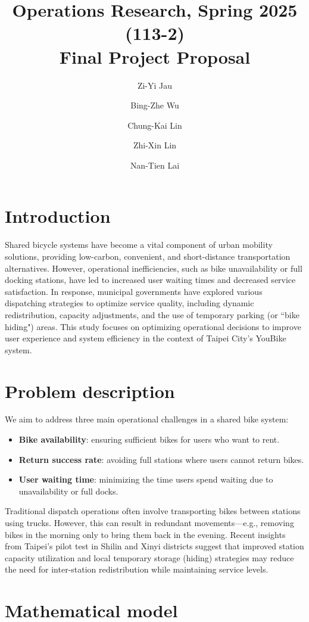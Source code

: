 \documentclass[11pt,a4paper]{article}
\title{Operations Research, Spring 2025 (113-2) \\ Final Project Proposal}
\author{Zi-Yi Jau} %
\author{Bing-Zhe Wu} %
\author{Chung-Kai Lin} %
\author{Zhi-Xin Lin} %
\author{Nan-Tien Lai} %
\affil{Department of Information Management, National Taiwan University}
\begin{document}
\maketitle

\section{Introduction}

Shared bicycle systems have become a vital component of urban mobility solutions, providing low-carbon, convenient, and short-distance transportation alternatives. However, operational inefficiencies, such as bike unavailability or full docking stations, have led to increased user waiting times and decreased service satisfaction. In response, municipal governments have explored various dispatching strategies to optimize service quality, including dynamic redistribution, capacity adjustments, and the use of temporary parking (or ``bike hiding") areas. This study focuses on optimizing operational decisions to improve user experience and system efficiency in the context of Taipei City's YouBike system.

\section{Problem description}

We aim to address three main operational challenges in a shared bike system:
\begin{itemize}
    \item \textbf{Bike availability}: ensuring sufficient bikes for users who want to rent.
    \item \textbf{Return success rate}: avoiding full stations where users cannot return bikes.
    \item \textbf{User waiting time}: minimizing the time users spend waiting due to unavailability or full docks.
\end{itemize}

Traditional dispatch operations often involve transporting bikes between stations using trucks. However, this can result in redundant movements—e.g., removing bikes in the morning only to bring them back in the evening. Recent insights from Taipei’s pilot test in Shilin and Xinyi districts suggest that improved station capacity utilization and local temporary storage (hiding) strategies may reduce the need for inter-station redistribution while maintaining service levels.

\section{Mathematical model}
\end{document}
